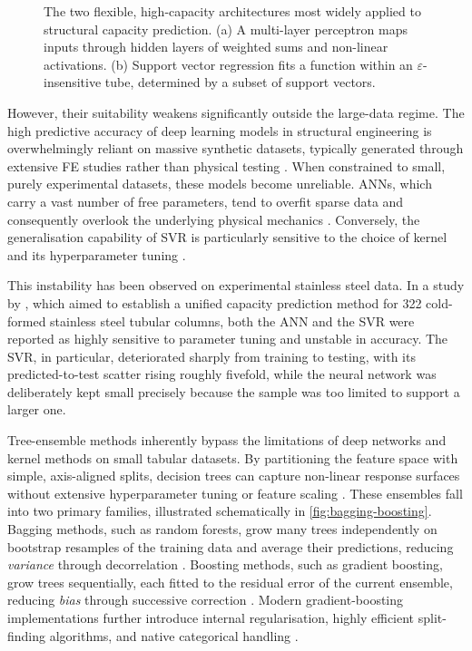 \begin{figure}[tbp]
  \centering
  \resizebox{\textwidth}{!}{}
  \caption[Neural network and support vector regression schematics]{The two
    flexible, high-capacity architectures most widely applied to structural
    capacity prediction. (a) A multi-layer perceptron maps inputs through
    hidden layers of weighted sums and non-linear activations. (b) Support
    vector regression fits a function within an $\varepsilon$-insensitive tube,
    determined by a subset of support vectors.}
  \label{fig:ann-svr}
\end{figure}

However, their suitability weakens significantly outside the large-data regime. The high predictive accuracy of deep learning models in structural engineering is overwhelmingly reliant on massive synthetic datasets, typically generated through extensive FE studies rather than physical testing \parencite{thai2022}. When constrained to small, purely experimental datasets, these models become unreliable. ANNs, which carry a vast number of free parameters, tend to overfit sparse data and consequently overlook the underlying physical mechanics \parencite{goodfellow2016,brigato2020}. Conversely, the generalisation capability of SVR is particularly sensitive to the choice of kernel and its hyperparameter tuning \parencite{hastie2009}.

This instability has been observed on experimental stainless steel data. In a study by \textcite{xu2021a}, which aimed to establish a unified capacity prediction method for 322 cold-formed stainless steel tubular columns, both the ANN and the SVR were reported as highly sensitive to parameter tuning and unstable in accuracy. The SVR, in particular, deteriorated sharply from training to testing, with its predicted-to-test scatter rising roughly fivefold, while the neural network was deliberately kept small precisely because the sample was too limited to support a larger one.

Tree-ensemble methods inherently bypass the limitations of deep networks and kernel methods on small tabular datasets. By partitioning the feature space with simple, axis-aligned splits, decision trees can capture non-linear response surfaces without extensive hyperparameter tuning or feature scaling \parencite{grinsztajn2022}. These ensembles fall into two primary families, illustrated schematically in \cref{fig:bagging-boosting}. Bagging methods, such as random forests, grow many trees independently on bootstrap resamples of the training data and average their predictions, reducing \emph{variance} through decorrelation \parencite{breiman2001}. Boosting methods, such as gradient boosting, grow trees sequentially, each fitted to the residual error of the current ensemble, reducing \emph{bias} through successive correction \parencite{friedman2001}. Modern gradient-boosting implementations further introduce internal regularisation, highly efficient split-finding algorithms, and native categorical handling \parencite{chen2016,ke2017,prokhorenkova2019}.

